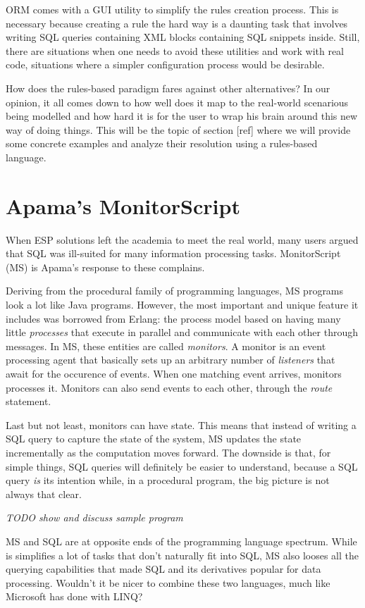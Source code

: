 \documentclass{report}
\begin{document}
ORM comes with a GUI utility to simplify the rules creation process. This is necessary because creating a rule the hard way is a daunting task that involves writing SQL queries containing XML blocks containing SQL snippets inside. Still, there are situations when one needs to avoid these utilities and work with real code, situations where a simpler configuration process would be desirable.

How does the rules-based paradigm fares against other alternatives? In our opinion, it all comes down to how well does it map to the real-world scenarious being modelled and how hard it is for the user to wrap his brain around this new way of doing things. This will be the topic of section [ref] where we will provide some concrete examples and analyze their resolution using a rules-based language.

\section{Apama's MonitorScript}

When ESP solutions left the academia to meet the real world, many users argued that SQL was ill-suited for many information processing tasks. MonitorScript (MS) is Apama's response to these complains.

Deriving from the procedural family of programming languages, MS programs look a lot like Java programs. However, the most important and unique feature it includes was borrowed from Erlang: the process model based on having many little \emph{processes} that execute in parallel and communicate with each other through messages. In MS, these entities are called \emph{monitors}. A monitor is an event processing agent that basically sets up an arbitrary number of \emph{listeners} that await for the occurence of events. When one matching event arrives, monitors processes it. Monitors can also send events to each other, through the \emph{route} statement.

Last but not least, monitors can have state. This means that instead of writing a SQL query to capture the state of the system, MS updates the state incrementally as the computation moves forward. The downside is that, for simple things, SQL queries will definitely be easier to understand, because a SQL query \emph{is} its intention while, in a procedural program, the big picture is not always that clear.

\emph{TODO show and discuss sample program}

MS and SQL are at opposite ends of the programming language spectrum. While is simplifies a lot of tasks that don't naturally fit into SQL, MS also looses all the querying capabilities that made SQL and its derivatives popular for data processing. Wouldn't it be nicer to combine these two languages, much like Microsoft has done with LINQ?
\end{document}
